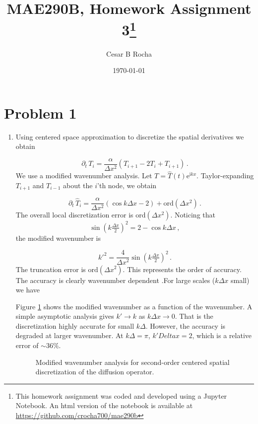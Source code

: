 \documentclass[11pt]{article}
\title{MAE290B, Homework Assignment 3\footnote{This homework assignment was coded and developed using a Jupyter Notebook. An html version of the notebook is available at \href{https://github.com/crocha700/mae290b}{https://github.com/crocha700/mae290b}}}
\author{Cesar B Rocha}
\date{\today}
\newcommand{\ord}{\mbox{ord}}
\newcommand{\ii}{\mathrm{i}}
\newcommand{\ee}{\mathrm{e}}
\newcommand{\com}{\, ,}
\newcommand{\per}{\, .}
\def\beq{\begin{equation}}
\def\eeq{\end{equation}}
\begin{document}
\maketitle

\section*{Problem 1}

\begin{enumerate}[label=(\alph*)]


    \item Using centered space approximation to discretize the spatial derivatives we obtain

        \beq
            \label{diff_discret_space}
            \partial_t \,T_i = \frac{\alpha}{\Delta x^2}\left(T_{i+1}-2T_i + T_{i+1}\right)\per
        \eeq
        We use a modified wavenumber analysis. Let $T = \hat{T}(t)\ee^{\ii k x}$. Taylor-expanding $T_{i+1}$ and $T_{i-1}$  about the $i$'th node, we obtain 
      
        \beq
            \label{diff_discret_space_mod}
            \partial_t \,\hat{T}_i = \frac{\alpha}{\Delta x^2}\left(\cos k\Delta x - 2\right) + \ord{(\Delta x^2)}\per
        \eeq
        The overall local discretization error is $\ord{(\Delta x^2)}$. Noticing that
        \beq
        \sin \left(k \tfrac{\Delta x}{2}\right)^2 = 2 - \cos k \Delta x\com
        \eeq
        the modified wavenumber is

        \beq
            \label{mod_k}
            k'^2 = \frac{4}{\Delta x^2}\sin \left(k \tfrac{\Delta x}{2}\right)^2\per
        \eeq
        The truncation error is $\ord{(\Delta x^2)}$. This represents the order of accuracy. The accuracy is clearly wavenumber dependent .For large scales ($k \Delta x$ small) we have

        Figure \ref{fig_mod_k} shows the modified wavenumber as a function of the wavenumber. A simple asymptotic analysis gives  $k'\to k$ as $k\Delta x \to 0$. That is the discretization highly accurate for small $k\Delta$. However, the accuracy is degraded at larger wavenumber. At $k\Delta=\pi$, $k'Delta x= 2$, which is a relative error of $\sim36\%$.
    
\begin{figure}[ht]
\centerline{}
\caption{Modified wavenumber analysis for second-order centered spatial discretization of the diffusion operator.}
    \label{fig_mod_k}
\end{figure}


\end{enumerate}
\end{document}
